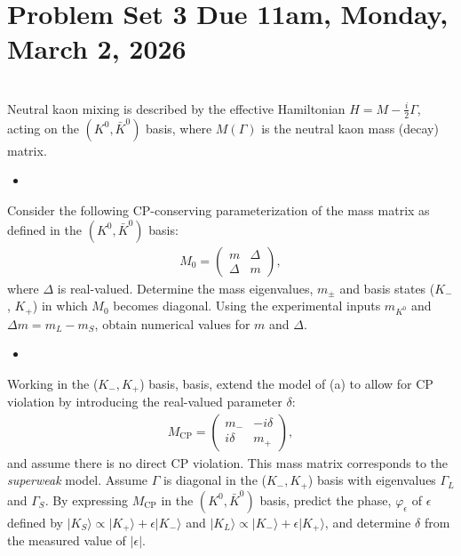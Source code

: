 \section*{Problem Set 3 Due 11am, Monday, March 2, 2026}


\\
Neutral kaon mixing is described by the effective Hamiltonian $H=M-\frac{i}{2}\Gamma$, acting on the $(K^0, \bar{K}^0)$ basis, where $M(\Gamma)$ is the neutral kaon mass (decay) matrix.

\begin{itemize}
    \item [(a)]
\end{itemize}
Consider the following CP-conserving parameterization of the mass matrix as defined in the $(K^0, \bar{K}^0)$ basis:
\begin{align}
M_0=\begin{pmatrix} m & \Delta \\ 
    \Delta & m \end{pmatrix},
\end{align}
where $\Delta$ is real-valued. Determine the mass eigenvalues, $m_\pm$ and basis states ($K_-$, $K_+$) in which $M_0$ becomes diagonal. Using the experimental inputs $m_{K^0}$ and $\Delta m=m_L-m_S$, obtain numerical values for $m$ and $\Delta$.

\begin{itemize}
    \item [(b)]
\end{itemize}
Working in the ($K_-, K_+$) basis, basis, extend the model of (a) to allow for CP
violation by introducing the real-valued parameter $\delta$:
\begin{align}
    M_{\text{CP}}= \begin{pmatrix}
        m_- & -i \delta \\
        i \delta & m_+
     \end{pmatrix},
\end{align}
and assume there is no direct CP violation. This mass matrix corresponds to the
\textit{superweak} model. Assume $\Gamma$ is diagonal in the ($K_-, K_+$) basis with eigenvalues $\Gamma_L$ and $\Gamma_S$. By expressing $M_{\text{CP}}$ in the $(K^0, \bar{K}^0)$ basis, predict the phase, $\varphi_\epsilon$ of $\epsilon$ defined by $|K_S\rangle \propto |K_+\rangle + \epsilon |K_-\rangle$ and $|K_L\rangle \propto |K_-\rangle + \epsilon |K_+\rangle$, and determine $\delta$ from the measured value of $|\epsilon|$.

